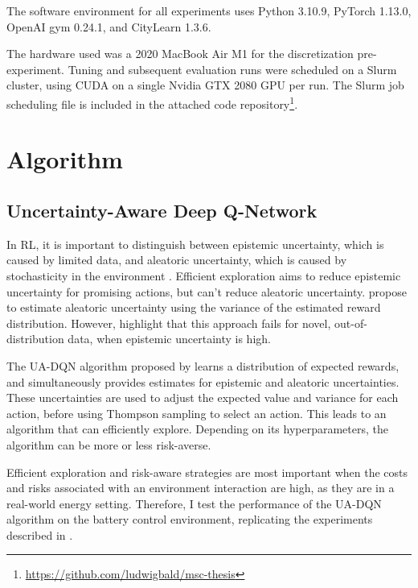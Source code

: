 The software environment for all experiments uses Python 3.10.9, PyTorch 1.13.0, OpenAI gym 0.24.1, and CityLearn 1.3.6.

The hardware used was a 2020 MacBook Air M1 for the discretization pre-experiment. Tuning and subsequent evaluation runs were scheduled on a Slurm cluster, using CUDA on a single Nvidia GTX 2080 GPU per run. The Slurm job scheduling file is included in the attached code repository\footnote{\url{https://github.com/ludwigbald/msc-thesis}}.


\section{Algorithm}
\subsection{Uncertainty-Aware Deep Q-Network} %
In RL, it is important to distinguish between epistemic uncertainty, which is caused by limited data, and aleatoric uncertainty, which is caused by stochasticity in the environment \citep{hullermeier2021AleatoricEpistemicUncertainty}.
Efficient exploration aims to reduce epistemic uncertainty for promising actions, but can't reduce aleatoric uncertainty.
\cite{nikolov2022InformationDirectedExplorationDeep} propose to estimate aleatoric uncertainty using the variance of the estimated reward distribution.
However, \cite{chua2018DeepReinforcementLearning} highlight that this approach fails for novel, out-of-distribution data, when epistemic uncertainty is high.

The UA-DQN algorithm proposed by \cite{clements2020EstimatingRiskUncertainty} learns a distribution of expected rewards, and simultaneously provides estimates for epistemic and aleatoric uncertainties.
These uncertainties are used to adjust the expected value and variance for each action, before using Thompson sampling to select an action.
This leads to an algorithm that can efficiently explore.
Depending on its hyperparameters, the algorithm can be more or less risk-averse.

Efficient exploration and risk-aware strategies are most important when the costs and risks associated with an environment interaction are high, as they are in a real-world energy setting.
Therefore, I test the performance of the UA-DQN algorithm on the battery control environment, replicating the experiments described in \cite{clements2020EstimatingRiskUncertainty}.

